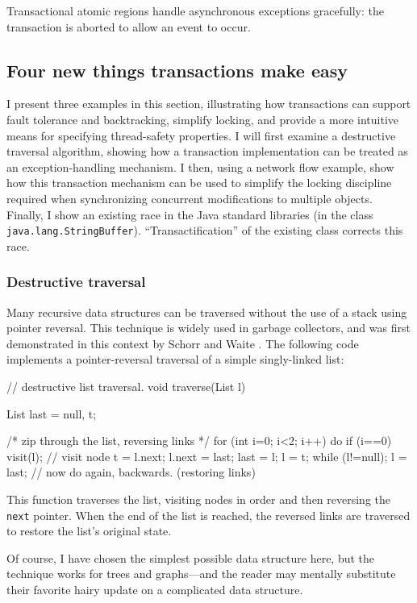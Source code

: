 Transactional atomic regions handle asynchronous exceptions
gracefully: the transaction is aborted to allow an
event to occur.

\subsection{Four new things transactions make easy}

I present three examples in this section, illustrating how
transactions can support fault tolerance and backtracking,
simplify locking, and provide a more intuitive
means for specifying thread-safety properties.
I will first examine a destructive traversal algorithm, showing how a
transaction implementation can be treated as an exception-handling
mechanism.   I then, using a network flow example, show how this
transaction mechanism can be used to simplify
the locking discipline required when synchronizing concurrent
modifications to multiple objects.
Finally, I show an existing race in the Java standard libraries (in 
the class \texttt{java.lang.StringBuffer}).  ``Transactification'' of
the existing class corrects this race.

\subsubsection{Destructive traversal}\label{sec:destruct}
Many recursive data structures can be traversed without the use of a
stack using pointer reversal.  This technique is widely used in
garbage collectors, and was first demonstrated in this context by
Schorr and Waite \cite{SchorrWa67}.  The following code implements a
pointer-reversal traversal of a simple singly-linked list:
\begin{inlinecode}
// destructive list traversal.
void traverse(List l) {
  List last = null, t;
  
  /* zip through the list, reversing links */
  for (int i=0; i<2; i++) {
    do {
      if (i==0) visit(l); // visit node
      t = l.next;
      l.next = last;
      last = l;
      l = t;
    } while (l!=null);
    l = last;
    // now do again, backwards. (restoring links)
  }
}
\end{inlinecode}

This function traverses the list, visiting nodes in order and then
reversing the {\tt next} pointer.  When the end of the list is
reached, the reversed links are traversed to restore the list's original
state.  

Of course, I have chosen the simplest possible data structure here, but
the technique works for trees and graphs---and the reader may mentally
substitute their favorite hairy update on a complicated data
structure.

